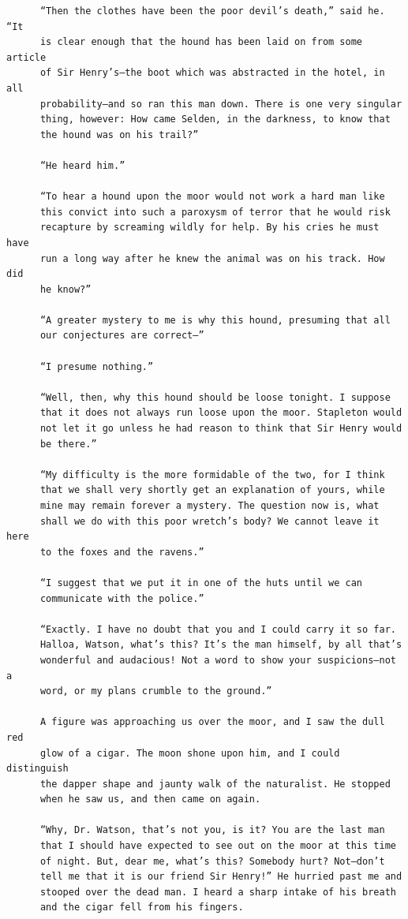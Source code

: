 \documentclass{article}
\begin{document}
\begin{verbatim}
      “Then the clothes have been the poor devil’s death,” said he. “It
      is clear enough that the hound has been laid on from some article
      of Sir Henry’s—the boot which was abstracted in the hotel, in all
      probability—and so ran this man down. There is one very singular
      thing, however: How came Selden, in the darkness, to know that
      the hound was on his trail?”

      “He heard him.”

      “To hear a hound upon the moor would not work a hard man like
      this convict into such a paroxysm of terror that he would risk
      recapture by screaming wildly for help. By his cries he must have
      run a long way after he knew the animal was on his track. How did
      he know?”

      “A greater mystery to me is why this hound, presuming that all
      our conjectures are correct—”

      “I presume nothing.”

      “Well, then, why this hound should be loose tonight. I suppose
      that it does not always run loose upon the moor. Stapleton would
      not let it go unless he had reason to think that Sir Henry would
      be there.”

      “My difficulty is the more formidable of the two, for I think
      that we shall very shortly get an explanation of yours, while
      mine may remain forever a mystery. The question now is, what
      shall we do with this poor wretch’s body? We cannot leave it here
      to the foxes and the ravens.”

      “I suggest that we put it in one of the huts until we can
      communicate with the police.”

      “Exactly. I have no doubt that you and I could carry it so far.
      Halloa, Watson, what’s this? It’s the man himself, by all that’s
      wonderful and audacious! Not a word to show your suspicions—not a
      word, or my plans crumble to the ground.”

      A figure was approaching us over the moor, and I saw the dull red
      glow of a cigar. The moon shone upon him, and I could distinguish
      the dapper shape and jaunty walk of the naturalist. He stopped
      when he saw us, and then came on again.

      “Why, Dr. Watson, that’s not you, is it? You are the last man
      that I should have expected to see out on the moor at this time
      of night. But, dear me, what’s this? Somebody hurt? Not—don’t
      tell me that it is our friend Sir Henry!” He hurried past me and
      stooped over the dead man. I heard a sharp intake of his breath
      and the cigar fell from his fingers.


\end{verbatim}
\end{document}
